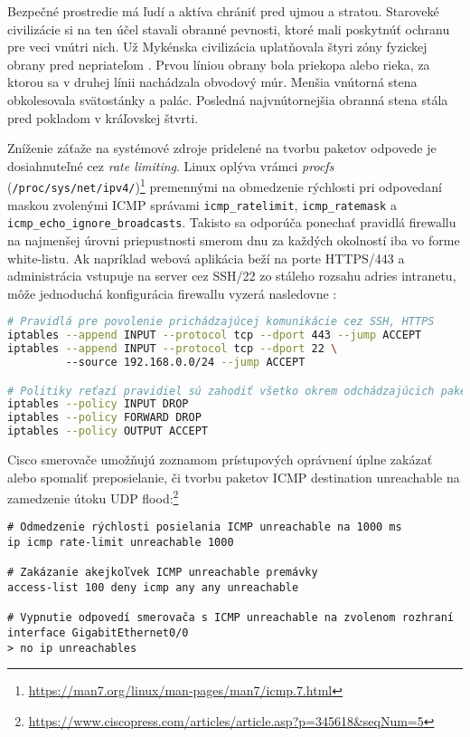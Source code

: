 \documentclass[12pt, a4paper]{article}
\begin{document}
Bezpečné prostredie má ľudí a aktíva chrániť pred ujmou a stratou. Staroveké civilizácie si na ten účel 
stavali obranné pevnosti, ktoré mali poskytnúť ochranu pre veci vnútri nich. Už Mykénska civilizácia 
uplatňovala štyri zóny fyzickej obrany pred nepriateľom \cite{physical-security}. Prvou líniou obrany
bola priekopa alebo rieka, za ktorou sa v druhej línii nachádzala obvodový múr. Menšia vnútorná stena
obkolesovala svätostánky a palác. Posledná najvnútornejšia obranná stena stála pred pokladom v kráľovskej 
štvrti. 



Zníženie záťaže na systémové zdroje pridelené na tvorbu paketov odpovede je dosiahnuteľné cez 
\emph{rate limiting}. Linux oplýva vrámci \emph{procfs} (\verb|/proc/sys/net/ipv4/|)\footnote{\url{https://man7.org/linux/man-pages/man7/icmp.7.html}} premennými na obmedzenie rýchlosti pri 
odpovedaní maskou zvolenými ICMP správami \verb|icmp_ratelimit|, \verb|icmp_ratemask| a 
\verb|icmp_echo_ignore_broadcasts|. Takisto sa odporúča ponechať pravidlá firewallu na najmenšej
úrovni priepustnosti smerom dnu za každých okolností iba vo forme white-listu.
Ak napríklad webová aplikácia beží na porte HTTPS/443 a administrácia vstupuje na server cez SSH/22 zo 
stáleho rozsahu adries intranetu, môže jednoduchá konfigurácia firewallu vyzerá nasledovne 
\cite{csirt-hardening}:
\begin{lstlisting}[language=bash]
# Pravidlá pre povolenie prichádzajúcej komunikácie cez SSH, HTTPS
iptables --append INPUT --protocol tcp --dport 443 --jump ACCEPT
iptables --append INPUT --protocol tcp --dport 22 \ 
         --source 192.168.0.0/24 --jump ACCEPT

# Politiky reťazí pravidiel sú zahodiť všetko okrem odchádzajúcich paketov
iptables --policy INPUT DROP
iptables --policy FORWARD DROP
iptables --policy OUTPUT ACCEPT
\end{lstlisting}

Cisco smerovače umožňujú zoznamom prístupových oprávnení úplne zakázať alebo spomaliť preposielanie, či tvorbu paketov ICMP destination unreachable na zamedzenie útoku UDP flood:\footnote{\url{https://www.ciscopress.com/articles/article.asp?p=345618&seqNum=5}}
\begin{lstlisting}
# Odmedzenie rýchlosti posielania ICMP unreachable na 1000 ms
ip icmp rate-limit unreachable 1000

# Zakázanie akejkoľvek ICMP unreachable premávky
access-list 100 deny icmp any any unreachable

# Vypnutie odpovedí smerovača s ICMP unreachable na zvolenom rozhraní
interface GigabitEthernet0/0
> no ip unreachables
\end{lstlisting}
\end{document}
